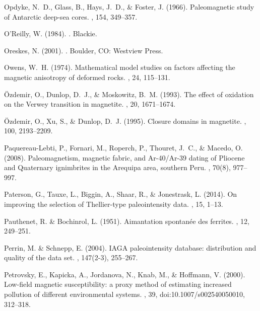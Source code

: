 \documentclass[11pt]{book}
\begin{document}
\begin{thebibliography}{}
Opdyke, N.~D., Glass, B., Hays, J.~D., \& Foster, J. (1966).
\newblock Paleomagnetic study of Antarctic deep-sea cores.
, 154, 349--357.

O'Reilly, W. (1984).
.
\newblock Blackie.

Oreskes, N. (2001).
.
\newblock Boulder, CO: Westview Press.

Owens, W.~H. (1974).
\newblock Mathematical model studies on factors affecting the magnetic
  anisotropy of deformed rocks.
, 24, 115--131.

\"Ozdemir, O., Dunlop, D.~J., \& Moskowitz, B.~M. (1993).
\newblock The effect of oxidation on the Verwey transition in magnetite.
, 20, 1671--1674.

\"Ozdemir, O., Xu, S., \& Dunlop, D.~J. (1995).
\newblock Closure domains in magnetite.
, 100, 2193--2209.

Paquereau-Lebti, P., Fornari, M., Roperch, P., Thouret, J.~C., \& Macedo, O.
  (2008).
\newblock Paleomagnetism, magnetic fabric, and Ar-40/Ar-39 dating of Pliocene
  and Quaternary ignimbrites in the Arequipa area, southern Peru.
, 70(8), 977--997.

Paterson, G., Tauxe, L., Biggin, A., Shaar, R., \& Jonestrask, L. (2014).
\newblock On improving the selection of Thellier-type paleointensity data.
, 15, 1--13.

Pauthenet, R. \& Bochinrol, L. (1951).
\newblock Aimantation spontan\'ee des ferrites.
, 12, 249--251.

Perrin, M. \& Schnepp, E. (2004).
\newblock IAGA paleointensity database: distribution and quality of the data
  set.
, 147(2-3), 255--267.

Petrovsky, E., Kapicka, A., Jordanova, N., Knab, M., \& Hoffmann, V. (2000).
\newblock Low-field magnetic susceptibility: a proxy method of estimating
  increased pollution of different environmental systems.
, 39, doi:10.1007/s002540050010, 312--318.


\end{thebibliography}
\end{document}
